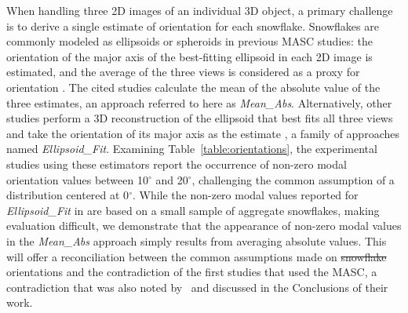 \documentclass[draft]{agujournal2019}
\providecommand{\DIFadd}[1]{{\protect\color{blue}\uwave{#1}}} %
\providecommand{\DIFdel}[1]{{\protect\color{red}\sout{#1}}}                      %
\providecommand{\DIFaddbegin}{} %
\providecommand{\DIFaddend}{} %
\providecommand{\DIFdelbegin}{} %
\providecommand{\DIFdelend}{} %
\begin{document}
When handling three 2D images of an individual 3D object, a primary challenge is to derive a single  estimate of orientation for each snowflake. Snowflakes are commonly modeled as ellipsoids or spheroids in previous MASC studies: the orientation of the major axis of the best-fitting ellipsoid in each 2D image is estimated, and the average of the three views is considered as a proxy for orientation \cite{Garrett_GRL_2015, Gergely_JGRA_2016, Fitch_AMT_2021, Fitch_JGR_2022}. The cited studies calculate the mean of the absolute value of the three estimates, an approach referred to here as \textit{Mean\_Abs}. Alternatively, other studies perform a 3D reconstruction of the ellipsoid that best fits all three views and take the orientation of its major axis as the estimate \cite{Jiang_JAS_2019}, a family of approaches named \textit{Ellipsoid\_Fit}. Examining Table~\ref{table:orientations}, the experimental studies using these estimators report the occurrence of non-zero modal orientation values between 10$^\circ$ and 20$^\circ$, challenging the common assumption of a distribution centered at 0$^\circ$. While the non-zero modal values reported for \textit{Ellipsoid\_Fit} in \cite{Jiang_JAS_2019} are based on a small sample of aggregate snowflakes, making evaluation difficult, we demonstrate that the appearance of non-zero modal values in the \textit{Mean\_Abs} approach simply results from averaging absolute values. This will offer a reconciliation between the common assumptions made on \DIFdelbegin \DIFdel{snowflake }\DIFdelend \DIFaddbegin \DIFadd{hydrometeor }\DIFaddend orientations and the contradiction of the first studies that used the MASC, a contradiction that was also noted by~ and discussed in the Conclusions of their work. 
\end{document}
